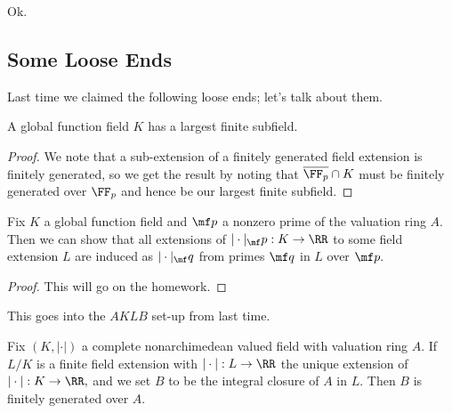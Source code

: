 \documentclass[../notes.tex]{subfiles}
\begin{document}

















Ok.

\subsection{Some Loose Ends}
Last time we claimed the following loose ends; let's talk about them.
\begin{lemma}
	A global function field $K$ has a largest finite subfield.
\end{lemma}
\begin{proof}
	We note that a sub-extension of a finitely generated field extension is finitely generated, so we get the result by noting that $\overline{\FF_p}\cap K$ must be finitely generated over $\FF_p$ and hence be our largest finite subfield.
\end{proof}
\begin{lemma}
	Fix $K$ a global function field and $\mf p$ a nonzero prime of the valuation ring $A.$ Then we can show that all extensions of $|\cdot|_\mf p:K\to\RR$ to some field extension $L$ are induced as $|\cdot|_\mf q$ from primes $\mf q$ in $L$ over $\mf p.$
\end{lemma}
\begin{proof}
	This will go on the homework.
\end{proof}
This goes into the $AKLB$ set-up from last time.
\begin{lemma}
	Fix $(K,|\cdot|)$ a complete nonarchimedean valued field with valuation ring $A.$ If $L/K$ is a finite field extension with $|\cdot|:L\to\RR$ the unique extension of $|\cdot|:K\to\RR,$ and we set $B$ to be the integral closure of $A$ in $L.$ Then $B$ is finitely generated over $A.$
\end{lemma}
\end{document}
